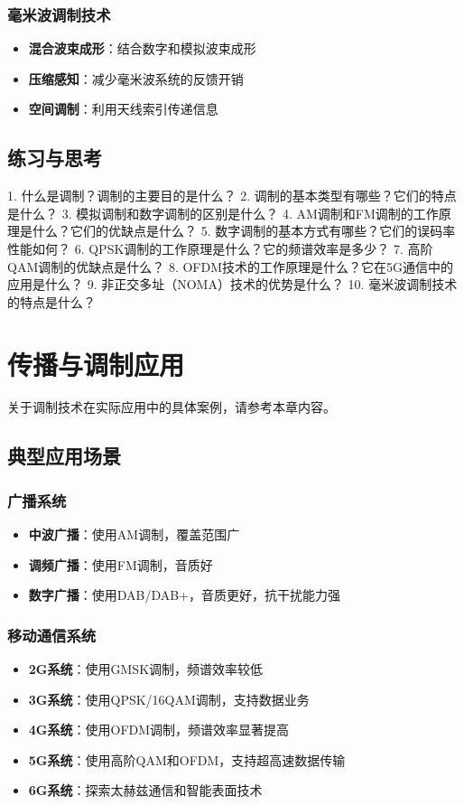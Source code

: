 \documentclass[12pt,UTF8]{ctexbook}
\begin{document}
\subsection{毫米波调制技术}
\begin{itemize}[leftmargin=3.5em]
    \item \textbf{混合波束成形}：结合数字和模拟波束成形
    \item \textbf{压缩感知}：减少毫米波系统的反馈开销
    \item \textbf{空间调制}：利用天线索引传递信息
\end{itemize}

\section{练习与思考}

1. 什么是调制？调制的主要目的是什么？
2. 调制的基本类型有哪些？它们的特点是什么？
3. 模拟调制和数字调制的区别是什么？
4. AM调制和FM调制的工作原理是什么？它们的优缺点是什么？
5. 数字调制的基本方式有哪些？它们的误码率性能如何？
6. QPSK调制的工作原理是什么？它的频谱效率是多少？
7. 高阶QAM调制的优缺点是什么？
8. OFDM技术的工作原理是什么？它在5G通信中的应用是什么？
9. 非正交多址（NOMA）技术的优势是什么？
10. 毫米波调制技术的特点是什么？

\chapter{传播与调制应用}
\label{传播与调制应用}

关于调制技术在实际应用中的具体案例，请参考本章内容。

\section{典型应用场景}

\subsection{广播系统}
\begin{itemize}[leftmargin=3.5em]
    \item \textbf{中波广播}：使用AM调制，覆盖范围广
    \item \textbf{调频广播}：使用FM调制，音质好
    \item \textbf{数字广播}：使用DAB/DAB+，音质更好，抗干扰能力强
\end{itemize}

\subsection{移动通信系统}
\begin{itemize}[leftmargin=3.5em]
    \item \textbf{2G系统}：使用GMSK调制，频谱效率较低
    \item \textbf{3G系统}：使用QPSK/16QAM调制，支持数据业务
    \item \textbf{4G系统}：使用OFDM调制，频谱效率显著提高
    \item \textbf{5G系统}：使用高阶QAM和OFDM，支持超高速数据传输
    \item \textbf{6G系统}：探索太赫兹通信和智能表面技术
\end{itemize}
\end{document}
